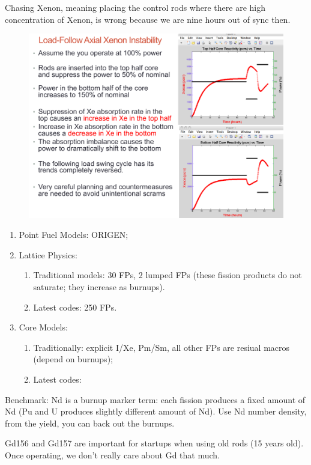 \documentclass{school-22.211-notes}
\begin{document}
Chasing Xenon, meaning placing the control rods where there are high concentration of Xenon, is wrong because we are nine hours out of sync then. 
\begin{figure}[ht]
  \centering
  \includegraphics[width=5in]{images/dfs/axial-xenon-instability.png}
\end{figure}

\clearpage
{}
\begin{enumerate}
\item Point Fuel Models: ORIGEN;
\item Lattice Physics: 
  \begin{enumerate}
    \item Traditional models: 30 FPs, 2 lumped FPs (these fission products do not saturate; they increase as burnups).
    \item Latest codes: 250 FPs. 
  \end{enumerate}
\item Core Models: 
  \begin{enumerate}
    \item Traditionally: explicit I/Xe, Pm/Sm, all other FPs are resiual macros (depend on burnups);
    \item Latest codes: 
  \end{enumerate}
\end{enumerate}

Benchmark: Nd is a burnup marker term: each fission produces a fixed amount of Nd (Pu and U produces slightly different amount of Nd). Use Nd number density, from the yield, you can back out the burnups. 

Gd156 and Gd157 are important for startups when using old rods (15 years old). Once operating, we don't really care about Gd that much. 
\end{document}

